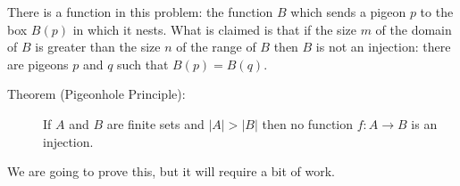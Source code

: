 \documentclass[12pt]{article}
\begin{document}
There is a function in this problem:  the function $B$ which sends a pigeon $p$ to the box $B(p)$ in which it nests.
What is claimed is that if the size $m$ of the domain of $B$ is greater than the size $n$ of the range of $B$ then $B$ is not an injection:  there are pigeons $p$ and $q$ such that $B(p) = B(q)$.

\begin{description}

\item[Theorem (Pigeonhole Principle):]  If $A$ and $B$ are finite sets and $|A|>|B|$ then no function $f:A \rightarrow B$ is an injection.

\end{description}

We are going to prove this, but it will require a bit of work.
\end{document}
